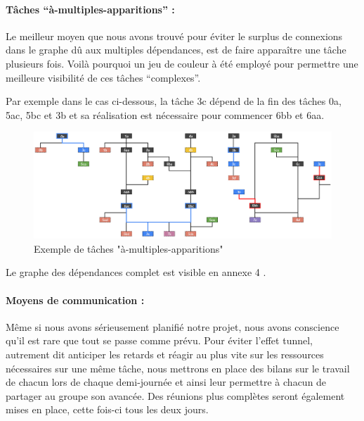 \documentclass[a4paper,12pt]{article} %
\begin{document}
\newpage
\paragraph{Tâches “à-multiples-apparitions” :\\}

Le meilleur moyen que nous avons trouvé pour éviter le surplus de connexions dans le graphe dû aux multiples dépendances, est de faire apparaître une tâche plusieurs fois.
Voilà pourquoi un jeu de couleur à été employé pour permettre une meilleure visibilité de ces tâches “complexes”.

Par exemple dans le cas ci-dessous, la tâche 3c dépend de la fin des tâches 0a, 5ac, 5bc et 3b et sa réalisation est nécessaire pour commencer 6bb et 6aa.

\begin{figure}[h]
\begin{center}
\includegraphics[width=17cm]{tachemul.png} 
\end{center}
\caption{Exemple de tâches "à-multiples-apparitions"}
\end{figure}

Le graphe des dépendances complet est visible en annexe 4 .

\paragraph{Moyens de communication :\\}

Même si nous avons sérieusement planifié notre projet, nous avons conscience qu’il est rare que tout se passe comme prévu. Pour éviter l’effet tunnel, autrement dit anticiper les retards et réagir au plus vite sur les ressources nécessaires sur une même tâche, nous mettrons en place des bilans sur le travail de chacun lors de chaque demi-journée et ainsi leur permettre à chacun de partager au groupe son avancée. Des réunions plus complètes seront également mises en place, cette fois-ci tous les deux jours.
\\
\end{document}
